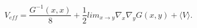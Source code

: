 \begin{equation}
V_{eff}= \frac{G^{-1}(x,x)}{8}+ \frac{1}{2} lim_{x \rightarrow y} \nabla_x
\nabla_y G(x,y) + \langle V \rangle.
\end{equation}

